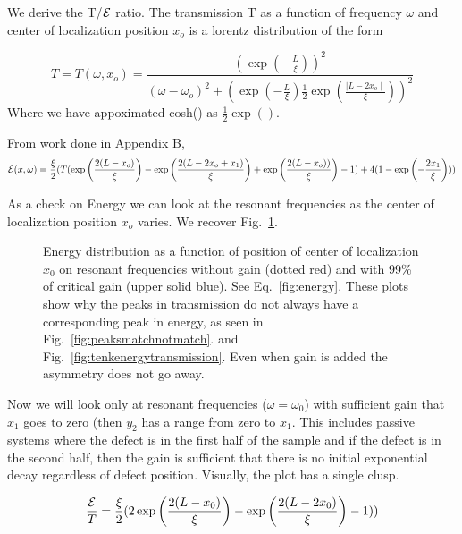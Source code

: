 We derive the T/${\cal E}$ ratio. The transmission T as a 
function of frequency $\omega$ and center of localization position $x_o$ 
is a lorentz distribution of the form

\begin{equation}
T = T(\omega, x_o) = \frac{(\exp(-\frac{L}{\xi}))^2}{ 
(\omega-\omega _o)^2 + (\exp(-\frac{L}{\xi})\frac{1}{2}\exp(\frac{\mid L-2 x_o \mid}{\xi}))^2 }
\label{fig:transmission}
\end{equation}
Where we have appoximated cosh() as $\frac{1}{2}\exp()$. 


From work done in Appendix B,
\begin{equation}
{\cal E}(x,\omega) = \frac{\xi}{2} ( T ( \exp\left(\frac{2(L-x_o)}{\xi}\right) - \exp\left(\frac{2(L-2 x_o+x_1)}{\xi}\right) + \exp\left(\frac{2(L-x_o))}{\xi}\right) -1 ) + 4 (1-\exp\left(-\frac{2 x_1}{\xi}\right)) )
\label{fig:energy}
\end{equation}

As a check on Energy we can look at the resonant frequencies as the center of localization position $x_o$ varies. We recover Fig.~\ref{fig:energydistrib}.

\begin{figure}
\vskip -0.5cm
\centerline{
}
\vskip -0.5cm
\caption{Energy distribution as a function of position of center
of localization $x_0$ on resonant frequencies without gain (dotted
red) and with 99\% of critical gain (upper solid blue). See 
Eq.~\ref{fig:energy}. These
plots show why the peaks in transmission do not always have a corresponding
peak in energy, as seen in Fig.~\ref{fig:peaksmatchnotmatch}. and 
Fig.~\ref{fig:tenkenergytransmission}. Even when gain is added the 
asymmetry does not go away.}
\label{fig:energydistrib}
\end{figure}

Now we will look only at resonant frequencies
($\omega = \omega_0$) with sufficient gain that $x_1$ goes to zero (then
$y_2$ has a range from zero to $x_1$. This includes passive systems where the defect is in
the first half of the sample and if the defect is in
the second half, then the gain is sufficient that there 
is no initial exponential decay regardless of defect position. Visually, the plot has a single clusp.  

\begin{equation}
\frac{\cal E}{T} = \frac{\xi}{2} ( 2 \exp\left(\frac{2(L-x_0)}{\xi}\right) - \exp\left(\frac{2(L-2 x_0)}{\xi}\right) -1 ) )
\end{equation}

